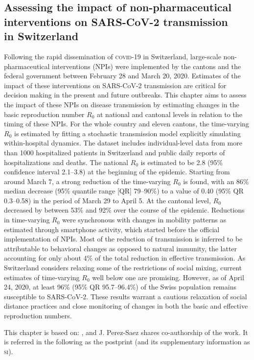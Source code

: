 \begin{fullwidth}
\chapter[Assessing the impact of non-pharmaceutical interventions on SARS-CoV-2 transmission in Switzerland]{Assessing the impact of non-pharmaceutical\\ interventions on SARS-CoV-2 transmission\\ in Switzerland}
\label{ch:covid-switzerland-npi}

Following the rapid dissemination of \textsc{covid}-19 in Switzerland, large-scale non-pharmaceutical interventions (NPIs) were implemented by the cantons and the federal government between February 28 and March 20, 2020. Estimates of the impact of these interventions on SARS-CoV-2 transmission are critical for decision making in the present and future outbreaks. This chapter aims to assess the impact of these NPIs on disease transmission by estimating changes in the basic reproduction number $R_0$ at national and cantonal levels in relation to the timing of these NPIs. For the whole country and eleven cantons, the time-varying $R_0$ is estimated by fitting a stochastic transmission model explicitly simulating within-hospital dynamics. The dataset includes individual-level data from more than 1000 hospitalized patients in Switzerland and public daily reports of hospitalizations and deaths. The national $R_0$ is estimated to be 2.8 (95\% confidence interval 2.1–3.8) at the beginning of the epidemic. Starting from around March 7, a strong reduction of the time-varying $R_0$ is found, with an 86\% median decrease (95\% quantile range [QR] 79–90\%) to a value of 0.40 (95\% QR 0.3–0.58) in the period of March 29 to April 5. At the cantonal level, $R_0$ decreased by between 53\% and 92\% over the course of the epidemic. Reductions in time-varying $R_0$ were synchronous with changes in mobility patterns as estimated through smartphone activity, which started before the official implementation of NPIs. Most of the reduction of transmission is inferred to be attributable to behavioral changes as opposed to natural immunity, the latter accounting for only about 4\% of the total reduction in effective transmission. As Switzerland considers relaxing some of the restrictions of social mixing, current estimates of time-varying $R_0$ well below one are promising. However, as of April 24, 2020, at least 96\% (95\% QR 95.7–96.4\%) of the Swiss population remains susceptible to SARS-CoV-2. These results warrant a cautious relaxation of social distance practices and close monitoring of changes in both the basic and effective reproduction numbers.

This chapter is based on:
, and J. Perez-Saez shares co-authorship of the work. It  is referred in the following as the postprint (and its supplementary information as \textsc{si}).
\end{fullwidth}

